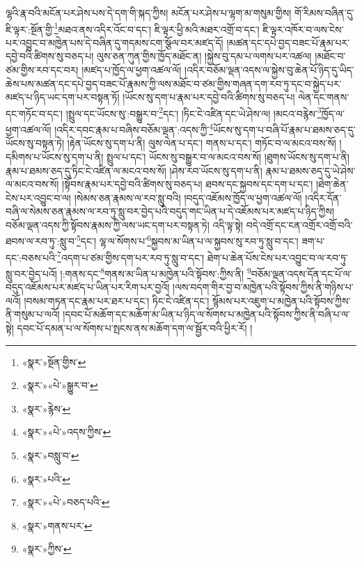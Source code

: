 ལྷའི་རྣ་བའི་མངོན་པར་ཤེས་པས་དེ་དག་གི་སྐད་ཀྱིས། མངོན་པར་ཤེས་པ་ལྷག་མ་གསུམ་གྱིས། གོ་རིམས་བཞིན་དུ་ཇི་ལྟར་:སྔོན་གྱི་\footnote{«སྣར་»སྔོན་གྱིས་}མཐའ་ནས་འདིར་འོང་བ་དང་། ཇི་ལྟར་ཕྱི་མའི་མཐར་འགྲོ་བ་དང་། ཇི་ལྟར་འཁོར་བ་ལས་ངེས་པར་འབྱུང་བ་མཁྱེན་པས་དེ་བཞིན་དུ་གདམས་ངག་སྩོལ་བར་མཛད་དོ། །མཚན་དང་དཔེ་བྱད་བཟང་པོ་རྣམ་པར་དབྱེ་བའི་ཚིགས་སུ་བཅད་པ། ལུས་ཅན་ཀུན་གྱིས་ཁྱོད་མཐོང་ན། །སྐྱེས་བུ་དམ་པ་ལགས་པར་འཚལ། །མཐོང་བ་ཙམ་གྱིས་རབ་དང་བར། །མཛད་པ་ཁྱོད་ལ་ཕྱག་འཚལ་ལོ། །འདིར་བཅོམ་ལྡན་འདས་ལ་སྐྱེས་བུ་ཆེན་པོ་ཉིད་དུ་ཡིད་ཆེས་པས་མཚན་དང་དཔེ་བྱད་བཟང་པོ་རྣམས་ཀྱི་ལས་མཐོང་བ་ཙམ་གྱིས་གཞན་དག་རབ་ཏུ་དང་བ་སྐྱེད་པར་མཛད་པ་ཉིད་ཡང་དག་པར་བསྟན་ཏོ། །ཡོངས་སུ་དག་པ་རྣམ་པར་དབྱེ་བའི་ཚིགས་སུ་བཅད་པ། ལེན་དང་གནས་དང་གཏོང་བ་དང་། །སྤྲུལ་དང་ཡོངས་སུ་:བསྒྱུར་བ་\footnote{«སྣར་»«པེ་»སྒྱུར་བ་}དང་། །ཏིང་ངེ་འཛིན་དང་ཡེ་ཤེས་ལ། །མངའ་བརྙེས་\footnote{«སྣར་»རྙེས་}ཁྱོད་ལ་ཕྱག་འཚལ་ལོ། །འདིར་དབང་རྣམ་པ་བཞིས་བཅོམ་ལྡན་:འདས་ཀྱི་\footnote{«སྣར་»«པེ་»འདས་ཀྱིས་}ཡོངས་སུ་དག་པ་བཞི་པོ་རྣམ་པ་ཐམས་ཅད་དུ་ཡོངས་སུ་བསྟན་ཏེ། །རྟེན་ཡོངས་སུ་དག་པ་ནི། ལུས་ལེན་པ་དང་། གནས་པ་དང་། གཏོང་བ་ལ་མངའ་བས་སོ། །དམིགས་པ་ཡོངས་སུ་དག་པ་ནི། སྤྲུལ་པ་དང་། ཡོངས་སུ་བསྒྱུར་བ་ལ་མངའ་བས་སོ། །ཐུགས་ཡོངས་སུ་དག་པ་ནི། རྣམ་པ་ཐམས་ཅད་དུ་ཏིང་ངེ་འཛིན་ལ་མངའ་བས་སོ། །ཤེས་རབ་ཡོངས་སུ་དག་པ་ནི། རྣམ་པ་ཐམས་ཅད་དུ་ཡེ་ཤེས་ལ་མངའ་བས་སོ། །སྟོབས་རྣམ་པར་དབྱེ་བའི་ཚིགས་སུ་བཅད་པ། ཐབས་དང་སྐྱབས་དང་དག་པ་དང་། །ཐེག་ཆེན་ངེས་པར་འབྱུང་བ་ལ། །སེམས་ཅན་རྣམས་ལ་རབ་སླུ་བའི། །བདུད་འཇོམས་ཁྱོད་ལ་ཕྱག་འཚལ་ལོ། །འདིར་དོན་བཞི་ལ་སེམས་ཅན་རྣམས་ལ་རབ་ཏུ་སླུ་བར་བྱེད་པའི་བདུད་གང་ཡིན་པ་དེ་འཇོམས་པར་མཛད་པ་ཉིད་ཀྱིས། བཅོམ་ལྡན་འདས་ཀྱི་སྟོབས་རྣམས་ཀྱི་ལས་ཡང་དག་པར་བསྟན་ཏེ། འདི་ལྟ་སྟེ། བདེ་འགྲོ་དང་ངན་འགྲོར་འགྲོ་བའི་ཐབས་ལ་རབ་ཏུ་:སླུ་བ་\footnote{«སྣར་»བསླུ་བ་}དང་། ལྷ་ལ་སོགས་པ་\footnote{«སྣར་»པའི་}སྐྱབས་མ་ཡིན་པ་ལ་སྐྱབས་སུ་རབ་ཏུ་སླུ་བ་དང་། ཟག་པ་དང་:བཅས་པའི་\footnote{«སྣར་»«པེ་»བཅད་པའི་}འདག་པ་ཙམ་གྱིས་དག་པར་རབ་ཏུ་སླུ་བ་དང་། ཐེག་པ་ཆེན་པོས་ངེས་པར་འབྱུང་བ་ལ་རབ་ཏུ་སླུ་བར་བྱེད་པའོ། །:གནས་དང་\footnote{«སྣར་»གནས་པར་}གནས་མ་ཡིན་པ་མཁྱེན་པའི་སྟོབས་:ཀྱིས་ནི། \footnote{«སྣར་»ཀྱིས་}བཅོམ་ལྡན་འདས་དོན་དང་པོ་ལ་བདུད་འཇོམས་པར་མཛད་པ་ཡིན་པར་རིག་པར་བྱའོ། །ལས་བདག་གིར་བྱ་བ་མཁྱེན་པའི་སྟོབས་ཀྱིས་ནི་གཉིས་པ་ལའོ། །བསམ་གཏན་དང་རྣམ་པར་ཐར་པ་དང་། ཏིང་ངེ་འཛིན་དང་། སྙོམས་པར་འཇུག་པ་མཁྱེན་པའི་སྟོབས་ཀྱིས་ནི་གསུམ་པ་ལའོ། །དབང་པོ་མཆོག་དང་མཆོག་མ་ཡིན་པ་ཉིད་ལ་སོགས་པ་མཁྱེན་པའི་སྟོབས་ཀྱིས་ནི་བཞི་པ་ལ་སྟེ། དབང་པོ་དམན་པ་ལ་སོགས་པ་སྤངས་ནས་མཆོག་དག་ལ་སྦྱོར་བའི་ཕྱིར་རོ། །
